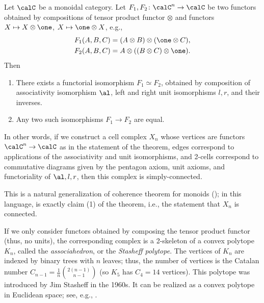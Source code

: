 \begin{theorem}\label{t:maclane}\par

  \noindent
  Let $\calC$ be a monoidal category. Let $F_1, F_2\colon \calC^n\to \calC$
  be two functors obtained by compositions of tensor product functor $\otimes$
  and functors $X\mapsto X\otimes \one$, $X\mapsto \one \otimes X$, e.g.,
  \begin{align*}
    F_1(A,B,C)&=(A\otimes B)\otimes (\one\otimes C),\\
    F_2(A,B,C)&=A\otimes (( B\otimes  C)\otimes \one).
  \end{align*}
  Then
  \begin{enumerate}
    \item There exists a functorial isomorphism $F_1\simeq F_2$, obtained
      by composition of associativity isomorphism $\al$, left and right
      unit isomorphisms $l,r$, and their inverses.
    \item Any two such isomorphisms $F_1\to F_2$ are equal.
  \end{enumerate}
\end{theorem}
In other words, if we construct a cell complex $X_n$ whose vertices are functors
$\calC^n\to \calC$ as in the statement of the theorem, edges correspond to
applications of the associativity and unit isomorphisms, and 2-cells correspond
to commutative diagrams given by the pentagon axiom, unit axioms, and
functoriality of $\al, l, r$, then this complex is simply-connected.

This is a natural generalization of coherence theorem for monoids
(); in this language, 
is exactly claim (1) of the theorem, i.e., the statement that $X_n$
is connected.

\begin{remark}\label{r:stasheff}
  If we only consider functors obtained by composing the tensor product functor
  (thus, no units), the corresponding complex is a 2-skeleton of a convex
  polytope $K_n$, called the \emph{associahedron}, or the
  \emph{Stasheff
  polytope}. The vertices of $K_n$ are indexed by
  binary trees with $n$ leaves; thus, the number of vertices is the Catalan
  number $C_{n-1} = \frac{1}{n}\binom{2(n-1)}{n-1}$ (so $K_5$ has
  $C_4 = 14$ vertices).
  This polytope was introduced by Jim Stasheff in the 1960s. It can be realized
  as a convex polytope in Euclidean space; see, e.g.,
  .
\end{remark}

